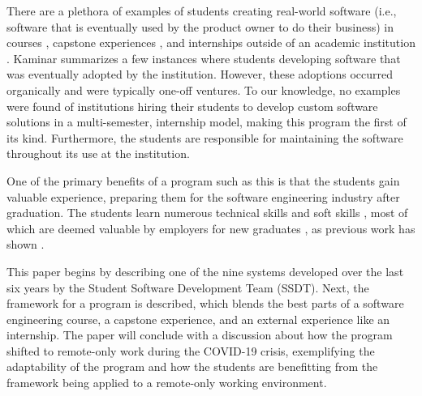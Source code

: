 There are a plethora of examples of students creating real-world software (i.e., software that is eventually used by the product owner to do their business) in courses \cite{tadayon2004software}, capstone experiences \cite{capstone}, and internships outside of an academic institution \cite{rochesterfirstundergradsoftwareteam}. Kaminar \cite{kaminer_2014} summarizes a few instances where students developing software that was eventually adopted by the institution. However, these adoptions occurred organically and were typically one-off ventures. To our knowledge, no examples were found of institutions hiring their students to develop custom software solutions in a multi-semester, internship model, making this program the first of its kind. Furthermore, the students are responsible for maintaining the software throughout its use at the institution.

One of the primary benefits of a program such as this is that the students gain valuable experience, preparing them for the software engineering industry after graduation. The students learn numerous technical skills and soft skills \cite{hardskills}, most of which are deemed valuable by employers for new graduates \cite{lavy2013soft}, as previous work has shown \cite{heggen2018hiring}.

This paper begins by describing one of the nine systems developed over the last six years by the Student Software Development Team (SSDT). Next, the framework for a program is described, which blends the best parts of a software engineering course, a capstone experience, and an external experience like an internship. The paper will conclude with a discussion about how the program shifted to remote-only work during the COVID-19 crisis, exemplifying the adaptability of the program and how the students are benefitting from the framework being applied to a remote-only working environment.
